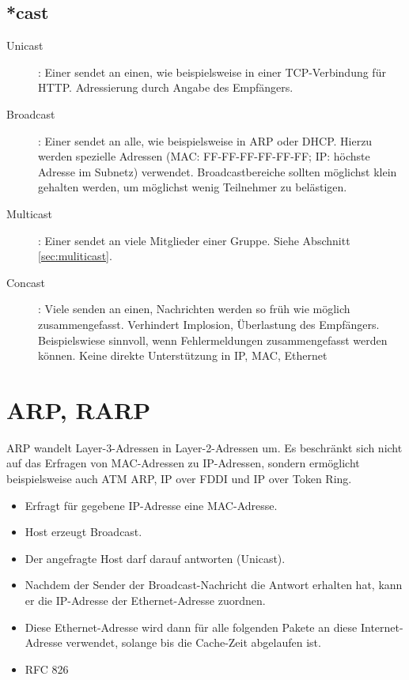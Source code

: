\documentclass{article} %
\begin{document}
\subsection{*cast} 
\begin{description}
	\item[Unicast]: Einer sendet an einen, wie beispielsweise in einer TCP-Verbindung für HTTP. Adressierung durch Angabe des Empfängers.
	\item[Broadcast]: Einer sendet an alle, wie beispielsweise in ARP oder DHCP. Hierzu werden spezielle Adressen (MAC: FF-FF-FF-FF-FF-FF; IP: höchste Adresse im Subnetz) verwendet. Broadcastbereiche sollten möglichst klein gehalten werden, um möglichst wenig Teilnehmer zu belästigen.
	\item[Multicast]: Einer sendet an viele Mitglieder einer Gruppe. Siehe Abschnitt \ref{sec:muliticast}.
	\item[Concast]: Viele senden an einen, Nachrichten werden so früh wie möglich zusammengefasst. Verhindert Implosion, Überlastung des Empfängers. Beispielswiese sinnvoll, wenn Fehlermeldungen zusammengefasst werden können. Keine direkte Unterstützung in IP, MAC, Ethernet
\end{description}

\section{ARP, RARP}


ARP wandelt Layer-3-Adressen in Layer-2-Adressen um.
Es beschränkt sich nicht auf das Erfragen von MAC-Adressen zu IP-Adressen, sondern ermöglicht beispielsweise auch ATM ARP, IP over FDDI und IP over Token Ring.
\begin{itemize}
	\item Erfragt für gegebene IP-Adresse eine MAC-Adresse.
	\item Host erzeugt Broadcast.
	\item Der angefragte Host darf darauf antworten (Unicast).
	\item Nachdem der Sender der Broadcast-Nachricht die Antwort erhalten hat, kann er die IP-Adresse der Ethernet-Adresse zuordnen.
	\item Diese Ethernet-Adresse wird dann für alle folgenden Pakete an diese Internet-Adresse verwendet, solange bis die Cache-Zeit abgelaufen ist.
	\item RFC 826 \cite{rfc826}
\end{itemize}
\end{document}

